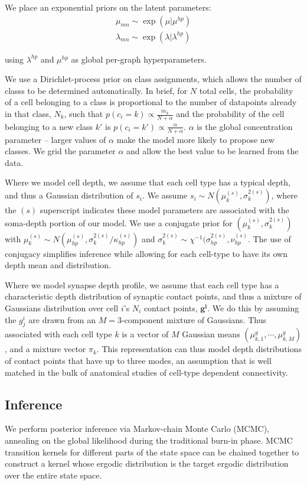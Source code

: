 \documentclass{article}
\renewcommand{\vec}[1]{\mathbf{#1}}
\begin{document}
We place an exponential priors on the latent parameters:
\begin{eqnarray}
 \mu_{mn} \sim \exp(\mu | \mu^{hp}) \\
\lambda_{mn} \sim \exp(\lambda | \lambda^{hp})
\end{eqnarray}

using  $\lambda^{hp}$ and $\mu^{hp}$ as global per-graph hyperparameters. 

We use a Dirichlet-process prior on class assignments, which allows
the number of classs to be determined automatically. In brief, for $N$
total cells, the probability of a cell belonging to a class is
proportional to the number of datapoints already in that class, $N_k$,
such that $p(c_i = k) \propto \frac{m_k}{N + \alpha}$ and the
probability of the cell belonging to a new class $k'$ is $p(c_i = k')
\propto \frac{\alpha}{N + \alpha}$. $\alpha$ is the global
concentration parameter -- larger values of $\alpha$ make the model
more likely to propose new classes. We grid the parameter $\alpha$ and
allow the best value to be learned from the data.


Where we model cell depth, we assume that 
each cell type has a typical depth, and thus a Gaussian distribution
of $s_i$. We assume $s_i \sim N(\mu^{(s)}_k,
\sigma^{2(s)}_k)$, where the $(s)$ superscript indicates
these model parameters are associated with the soma-depth 
portion of our model.  We use a conjugate prior for $(\mu^{(s)}_k, \sigma^{2(s)}_k)$ with
$\mu^{(s)}_k \sim N(\mu^{(s)}_{hp}, \sigma^{2(s)}_k/ \kappa^{(s)}_{hp})$ and $\sigma^{2(s)}_k \sim
\chi^{-1}(\sigma^{2(s)}_{hp}, \nu^{(s)}_{hp}$. The use of conjugacy simplifies inference while allowing for each cell-type to have its own depth mean and distribution. 

Where we model synapse depth profile, we assume that each cell
type has a characteristic depth distribution of synaptic contact points, and thus
a mixture of Gaussians distribution over cell $i$’s $N_i$ contact points, $\vec{g^i}$.
We do this by assuming the $g^i_j$
are drawn from an $M=3$-component mixture of Gaussians. Thus associated with each cell type $k$ is a vector
of $M$ Gaussian means $(\mu^g_{k,1}, \cdots, \mu^g_{k, M})$, and a
mixture vector $\pi_k$.  This representation can thus model depth distributions of contact points that have up to three modes, an assumption that is well matched in the bulk of anatomical studies of cell-type dependent connectivity.


\subsection*{Inference} 
We perform posterior inference via Markov-chain Monte Carlo (MCMC),
annealing on the global likelihood during the traditional burn-in
phase. MCMC transition kernels for different parts of the state space
can be chained together to construct a kernel whose ergodic
distribution is the target ergodic distribution over the entire state space. 
\end{document}
